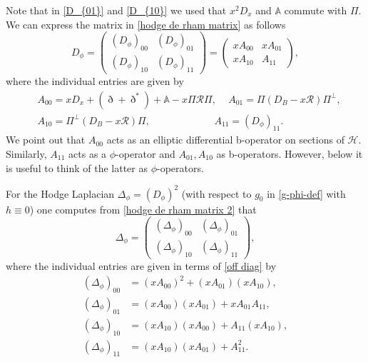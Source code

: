 \documentclass[JEP,XML,SOM,Unicode,NoFloatCountersInSection,published]{cedram}
\theoremstyle{plain}
\theoremstyle{definition}
\begin{document}
Note that in \eqref{D_{01}} and \eqref{D_{10}} we used that
$x^{2}D_{x}$ and $\mathbb{A}$ commute with $\Pi$.
We can express the matrix in \eqref{hodge de rham matrix} as follows
\begin{equation}\label{hodge de rham matrix 2}
D_\phi =
\begin{pmatrix}
(D_\phi)_{00} & (D_\phi)_{01}\\
(D_\phi)_{10} & (D_\phi)_{11}
\end{pmatrix}
= \begin{pmatrix}
xA_{00} & xA_{01}\\
xA_{10} & A_{11}
\end{pmatrix},
\end{equation}
where the individual entries are given by
\begin{equation} \label{off diag}
\begin{split}
&A_{00} = xD_{x} + (\eth + \eth^{*}) + \mathbb{A} - x\Pi \mathscr{R}\Pi,\,
\quad A_{01} = \Pi\left(D_{B} - x\mathscr{R} \right)\Pi^{\bot},\\
&A_{10} = \Pi^{\bot}\left(D_{B} - x\mathscr{R}\right)\Pi, \,
\qquad \qquad \qquad \ A_{11} = (D_\phi)_{11}.
\end{split}\end{equation}
We point out that $A_{00}$ acts as an elliptic differential b-operator on sections of $\mathscr{H}$.
Similarly, $A_{11}$ acts as a $\phi$-operator and $A_{01}, A_{10}$
as b-operators. However, below it is useful to think of the latter as $\phi$-operators.

For the Hodge Laplacian $\Delta_{\phi} = (D_\phi)^{2}$
(with respect to $g_0$ in \eqref{g-phi-def} with $h\equiv 0$) one computes from \eqref{hodge de rham matrix 2}
that
\begin{equation}\label{hodge laplace matrix }
\Delta_{\phi} =
\begin{pmatrix}
(\Delta_{\phi})_{00} & (\Delta_{\phi})_{01}\\
(\Delta_{\phi})_{10} & (\Delta_{\phi})_{11}
\end{pmatrix},
\end{equation}
where the individual entries are given in terms of \eqref{off diag} by
\begin{align*}
(\Delta_{\phi})_{00} &= (xA_{00})^{2} + (xA_{01})(xA_{10}),\\
(\Delta_{\phi})_{01} &= (xA_{00})(xA_{01})+ xA_{01}A_{11},\\
(\Delta_{\phi})_{10} &= (xA_{10})(xA_{00})+ A_{11}(xA_{10}),\\
(\Delta_{\phi})_{11} &= (xA_{10})(xA_{01}) + A_{11}^2.
\end{align*}
\end{document}
